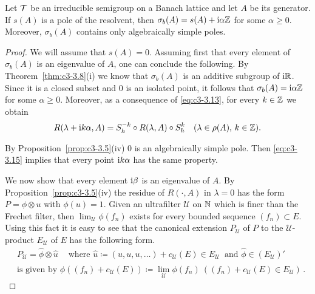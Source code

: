 \begin{theorem}\label{thm:c3-3.12}

Let $\mathcal{T}$ be an irreducible semigroup on a Banach lattice and let $A$ be its generator.
If $s(A)$ is a pole of the resolvent, then $\sigma_{b}(A) = s(A) + \mathrm{i}\alpha\mathbb{Z}$ for some $\alpha \geq 0$.
Moreover, $\sigma_{b}(A)$ contains only algebraically simple poles.
\end{theorem}
\begin{proof}
	We will assume that $s(A) = 0$.
	Assuming first that every element of $\sigma_{b}(A)$ is an eigenvalue of $A$, one can conclude the following.
	By Theorem~\ref{thm:c3-3.8}(i) we know that $\sigma_{b}(A)$ is an additive subgroup of $\mathrm{i}\mathbb{R} $.
	Since it is a closed subset and $0$ is an isolated point, it follows that $\sigma_{b}(A) = \mathrm{i}\alpha\mathbb{Z}$ for some $\alpha \geq 0$.
	Moreover, as a consequence of \eqref{eq:c3-3.13}, for every $k \in \mathbb{Z}$ we obtain
	\begin{equation}\label{eq:c3-3.15}
		R(\lambda+\mathrm{i} k\alpha,A) = S_{h}^{-k}\circ R(\lambda,A)\circ S_{h}^{k} \quad (\lambda \in \rho(A),\, k \in \mathbb{Z}).
	\end{equation}
	
	By Proposition~\ref{prop:c3-3.5}(iv) $0$ is an algebraically simple pole.
	Then \eqref{eq:c3-3.15} implies that every point $\mathrm{i} k\alpha$ has the same property.
	
	We now show that every element $\mathrm{i}\beta$ is an eigenvalue of $A$.
	By Proposition~\ref{prop:c3-3.5}(iv) the residue of $R(\cdot,A)$ in $\lambda = 0$ has the form $P = \phi\otimes u$ with $\phi(u) = 1$.
	Given an ultrafilter $\mathcal{U}$ on $\mathbb{N}$ which is finer than the Frechet filter, then $\lim_{\mathcal{U}}\phi(f_{n})$ exists for every bounded sequence $(f_{n}) \subset E$.
	Using this fact it is easy to see that the canonical extension $P_{\mathcal{U}}$ of $P$ to the $\mathcal{U}$-product $E_{\mathcal{U}}$ of $E$ has the following form.
	\begin{equation}\label{eq:c3-3.16}
		\begin{aligned}
		&P_{\mathcal{U}} = \hat{\phi}\otimes\hat{u} \quad \ \text{where } \hat{u} \coloneqq (u,u,u,\ldots)+c_{\mathcal{U}}(E) \in E_{\mathcal{U}} \ \text{ and } \hat{\phi} \in (E_{\mathcal{U}})'
		\\
		&\text{is given by } \hat{\phi}((f_{n})+c_{\mathcal{U}}(E)) \coloneqq \lim_{\mathcal{U}}\phi(f_{n}) \ ((f_{n})+c_{\mathcal{U}}(E) \in E_{\mathcal{U}})\,.
		\end{aligned}
	\end{equation}
	

\end{proof}
